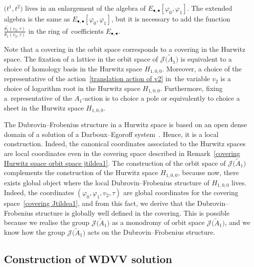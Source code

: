 \documentclass[pdftex]{sigma}%
\numberwithin{equation}{section}
\newcommand{\Ja}{\mathcal{J}}
\begin{document}
\begin{Remark}
 $\big(t^1,t^2\big)$ lives in an enlargement of the algebra of $E_{\bullet,\bullet}[\varphi_0,\varphi_1]$. The extended algebra is the same as $E_{\bullet,\bullet}[\varphi_0,\varphi_1]$, but it is necessary to add the function $\frac{\theta_1^{\prime}(v_2,\tau)}{\theta_1(v_2,\tau)}$ in the ring of~coefficients $E_{\bullet,\bullet}$.
\end{Remark}

\begin{Remark}\label{covering Hurwitz space orbit space jtildea1}
Note that a covering in the orbit space corresponds to a covering in the Hurwitz space. The fixation of a lattice in the orbit space of $\Ja\big(\tilde A_1\big)$ is equivalent to a choice of homology basis in the Hurwitz space $H_{1,0,0}$. Moreover, a choice of the representative of the action~\eqref{translation action of v2} in~the variable $v_2$ is a choice of logarithm root in the Hurwitz space $H_{1,0,0}$. Furthermore, fixing a~representative of the $A_1$-action is to choice a pole or equivalently to choice a sheet in the Hurwitz space $H_{1,0,0}$.
\end{Remark}

\begin{Remark}
The Dubrovin--Frobenius structure in a Hurwitz space is based on an open dense domain of a solution of a Darboux--Egoroff system~\cite{B.Dubrovin2, V.Shramchenko}. Hence, it is a local construction. Indeed, the canonical coordinates associated to the Hurwitz spaces are local coordinates even in the covering space described in Remark~\ref{covering Hurwitz space orbit space jtildea1}. The construction of the orbit space of $\Ja\big(\tilde A_1\big)$ complements the construction of the Hurwitz space $H_{1,0,0}$, because now, there exists global object where the local Dubrovin--Frobenius structure of $H_{1,0,0}$ lives. Indeed, the coordinates $(\varphi_0,\varphi_1,v_2,\tau)$ are global coordinates for the covering space~\eqref{covering Jtildea1}, and from this fact, we derive that the Dubrovin--Frobenius structure is globally well defined in the covering. This is possible because we realise the group $\Ja\big(\tilde A_1\big)$ as a monodromy of orbit space $\Ja\big(\tilde A_1\big)$, and we know how the group $\Ja\big(\tilde A_1\big)$ acts on the Dubrovin--Frobenius structure.
\end{Remark}

\subsection{Construction of WDVV solution}\label{Construction of WDVV solution}
\end{document}
